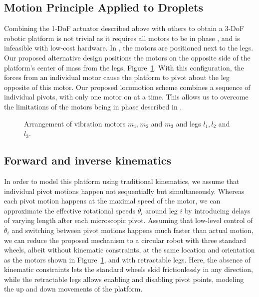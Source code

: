 \documentclass[letterpaper, 10pt, conference]{ieeeconf}
\begin{document}
\subsection{Motion Principle Applied to Droplets}
Combining the 1-DoF actuator described above with others to obtain a 3-DoF robotic platform is not trivial as it requires all motors to be in phase \cite{Vartholomeos2005}, and is infeasible with low-cost hardware. In \cite{Vartholomeos2005}, the motors are positioned next to the legs. Our proposed alternative design positions the motors on the opposite side of the platform's center of mass from the legs, Figure~\ref{DropletMotorDiagram}. With this configuration, the forces from an individual motor cause the platform to pivot about the leg opposite of this motor. Our proposed locomotion scheme combines a sequence of individual pivots, with only one motor on at a time. This allows us to overcome the limitations of the motors being in phase described in \cite{Vartholomeos2005}.

\begin{figure}[!htb]
\centering

\caption{Arrangement of vibration motors $m_1, m_2$ and $m_3$ and legs $l_1, l_2$ and $l_3$.}
\label{DropletMotorDiagram}
\end{figure}

\subsection{Forward and inverse kinematics}
In order to model this platform using traditional kinematics, we assume that individual pivot motions happen not sequentially but simultaneously. Whereas each pivot motion happens at the maximal speed of the motor, we can approximate the effective rotational speeds $\dot{\theta}_i$ around leg $i$ by introducing delays of varying length after each microscopic pivot. Assuming that low-level control of $\dot{\theta}_i$ and switching between pivot motions happens much faster than actual motion, we can reduce the proposed mechanism to a circular robot with three standard wheels, albeit without kinematic constraints, at the same location and orientation as the motors shown in Figure~\ref{DropletMotorDiagram}, and with retractable legs. Here, the absence of kinematic constraints lets the standard wheels skid frictionlessly in any direction, while the retractable legs allows enabling and disabling pivot points, modeling the up and down movements of the platform. 
\end{document}
